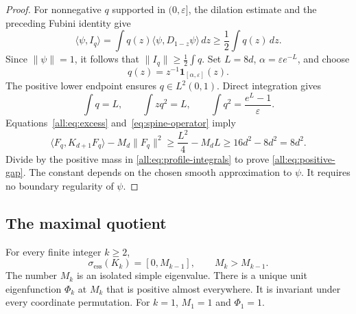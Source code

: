 \documentclass[11pt]{article}
\begin{document}
\begin{proof}
For nonnegative $q$ supported in $(0,\varepsilon]$, the dilation estimate
and the preceding Fubini identity give
\[
 \langle\psi,I_q\rangle
 =\int q(z)\langle\psi,D_{1-z}\psi\rangle\,dz
 \geq\frac12\int q(z)\,dz.
\]
Since $\|\psi\|=1$, it follows that $\|I_q\|\geq\tfrac12\int q$.
Set $L=8d$, $\alpha=\varepsilon e^{-L}$, and choose
\[
 q(z)=z^{-1}\mathbf1_{[\alpha,\varepsilon]}(z).
\]
The positive lower endpoint ensures $q\in L^2(0,1)$.
Direct integration gives
\begin{equation}\label{all:eq:profile-integrals}
 \int q=L,\qquad \int zq^2=L,\qquad
 \int q^2=\frac{e^L-1}{\varepsilon}.
\end{equation}
Equations~\eqref{all:eq:excess} and~\eqref{eq:spine-operator} imply
\[
 \langle F_q,K_{d+1}F_q\rangle-M_d\|F_q\|^2
 \geq\frac{L^2}{4}-M_dL
 \geq16d^2-8d^2=8d^2.
\]
Divide by the positive mass in \eqref{all:eq:profile-integrals} to prove
\eqref{all:eq:positive-gap}.
The constant depends on the chosen smooth approximation to $\psi$.
It requires no boundary regularity of $\psi$.
\end{proof}

\subsection{The maximal quotient}

\begin{theorem}\label{all:thm:all-dimensions}
For every finite integer $k\geq2$,
\[
 \sigma_{\mathrm{ess}}(K_k)=[0,M_{k-1}],\qquad M_k>M_{k-1}.
\]
The number $M_k$ is an isolated simple eigenvalue.
There is a unique unit eigenfunction $\Phi_k$ at $M_k$ that is positive
almost everywhere.  It is invariant under every coordinate permutation.
For $k=1$, $M_1=1$ and $\Phi_1=1$.
\end{theorem}
\end{document}
